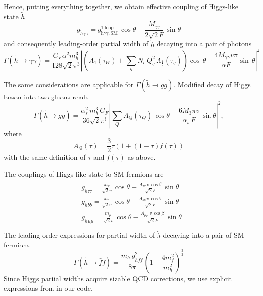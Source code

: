 \documentclass[10pt]{article}
\begin{document}
Hence, putting everything together, we obtain effective coupling of Higgs-like state $\tilde{h}$
\begin{equation}
\label{effcouple}
g_{\tilde{h}\gamma \gamma} = g_{\text{h}\gamma \gamma,\text{SM}}^{\text{1-loop}} \, \cos \theta + \frac{M_{\gamma \gamma}}{2\sqrt{2}F} \, \sin \theta
\end{equation}
and consequently leading-order partial width of $\tilde{h}$ decaying into a pair of photons
\begin{equation}
\label{Ghgmgm}
\Gamma(\tilde{h}\rightarrow \gamma \gamma) = \frac{G_F \alpha^2 m_h^3}{128\sqrt{2}\pi^3} \left\vert  \left(A_{1}(\tau_W)+\sum_{q} N_c \, Q_q^2 \, A_{\frac{1}{2}}(\tau_q)\right) \cos \, \theta + \frac{4 M_{\gamma \gamma} v \pi}{\alpha F} \sin \, \theta\right\vert^2
\end{equation}

\noindent
The same considerations are applicable for $\Gamma(\tilde{h}\rightarrow gg)$. Modified decay of Higgs boson into two gluons reads
\begin{equation}
\label{Ghgg}
\Gamma(\tilde{h}\rightarrow gg) = \frac{\alpha_s^2 \, m_h^3 \, G_F}{36\sqrt{2}\pi^3} \left \vert \sum_{Q} A_{Q}(\tau_Q) \, \cos \theta + \frac{6 M_3 \pi v}{\alpha_s \, F} \, \sin \theta \right \vert^2,
\end{equation}
where 
\begin{equation}
\label{AQ}
A_Q(\tau) = \frac{3}{2} \tau (1+(1-\tau) f(\tau))
\end{equation}
with the same definition of $\tau$ and $f(\tau)$ as above.

\noindent
The couplings of Higgs-like state to SM fermions are
\begin{eqnarray}
\label{no26}
\begin{aligned}
& g_{\tilde{h} \tau \tau} = \frac{m_{\tau}}{\sqrt{2}v} \, \cos \theta - \frac{A_{\tau \tau}\,  v \, \cos \beta}{\sqrt{2}F} \, \sin \theta \\
& g_{\tilde{h} bb} = \frac{m_b}{\sqrt{2}v} \, \cos \theta - \frac{A_{bb} \, v \, \cos \beta}{\sqrt{2}F} \, \sin \theta \\
& g_{\tilde{h} \mu \mu} = \frac{m_{\mu}}{\sqrt{2}v} \, \cos \theta - \frac{A_{\mu \mu}\,  v \, \cos \beta}{\sqrt{2}F} \, \sin \theta \\
\end{aligned}
\end{eqnarray}
The leading-order expressions for partial width of $\tilde{h}$ decaying into a pair of SM fermions
\begin{equation}
\label{hff}
\Gamma(\tilde{h} \rightarrow \bar{f}f) = \frac{m_h \, g_{\tilde{h}ff}^2}{8 \pi} \left(1- \frac{4m_f^2}{m_h^2}\right)^{\frac{3}{2}}
\end{equation}
Since Higgs partial widths acquire sizable QCD corrections, we use explicit expressions from \cite{SpiraQCD} in our code.
\end{document}
